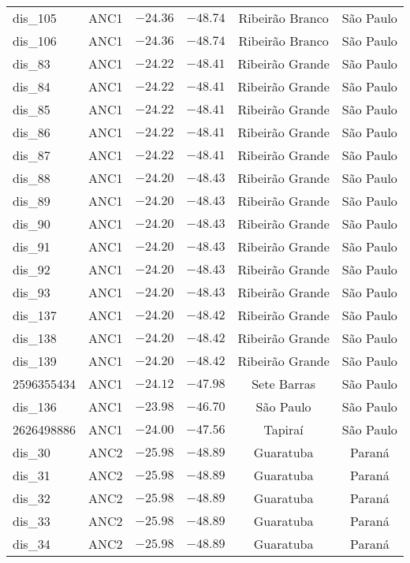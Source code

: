 \begin{longtable}{lccccc}
dis\_105 & ANC1 & $-24.36$ & $-48.74$ & Ribeirão Branco & São Paulo \\ 
dis\_106 & ANC1 & $-24.36$ & $-48.74$ & Ribeirão Branco & São Paulo \\ 
dis\_83 & ANC1 & $-24.22$ & $-48.41$ & Ribeirão Grande & São Paulo \\ 
dis\_84 & ANC1 & $-24.22$ & $-48.41$ & Ribeirão Grande & São Paulo \\ 
dis\_85 & ANC1 & $-24.22$ & $-48.41$ & Ribeirão Grande & São Paulo \\ 
dis\_86 & ANC1 & $-24.22$ & $-48.41$ & Ribeirão Grande & São Paulo \\ 
dis\_87 & ANC1 & $-24.22$ & $-48.41$ & Ribeirão Grande & São Paulo \\ 
dis\_88 & ANC1 & $-24.20$ & $-48.43$ & Ribeirão Grande & São Paulo \\ 
dis\_89 & ANC1 & $-24.20$ & $-48.43$ & Ribeirão Grande & São Paulo \\ 
dis\_90 & ANC1 & $-24.20$ & $-48.43$ & Ribeirão Grande & São Paulo \\ 
dis\_91 & ANC1 & $-24.20$ & $-48.43$ & Ribeirão Grande & São Paulo \\ 
dis\_92 & ANC1 & $-24.20$ & $-48.43$ & Ribeirão Grande & São Paulo \\ 
dis\_93 & ANC1 & $-24.20$ & $-48.43$ & Ribeirão Grande & São Paulo \\ 
dis\_137 & ANC1 & $-24.20$ & $-48.42$ & Ribeirão Grande & São Paulo \\ 
dis\_138 & ANC1 & $-24.20$ & $-48.42$ & Ribeirão Grande & São Paulo \\ 
dis\_139 & ANC1 & $-24.20$ & $-48.42$ & Ribeirão Grande & São Paulo \\ 
2596355434 & ANC1 & $-24.12$ & $-47.98$ & Sete Barras & São Paulo \\ 
dis\_136 & ANC1 & $-23.98$ & $-46.70$ & São Paulo & São Paulo \\ 
2626498886 & ANC1 & $-24.00$ & $-47.56$ & Tapiraí & São Paulo \\ 
dis\_30 & ANC2 & $-25.98$ & $-48.89$ & Guaratuba & Paraná \\ 
dis\_31 & ANC2 & $-25.98$ & $-48.89$ & Guaratuba & Paraná \\ 
dis\_32 & ANC2 & $-25.98$ & $-48.89$ & Guaratuba & Paraná \\ 
dis\_33 & ANC2 & $-25.98$ & $-48.89$ & Guaratuba & Paraná \\ 
dis\_34 & ANC2 & $-25.98$ & $-48.89$ & Guaratuba & Paraná \\ 

\end{longtable}
